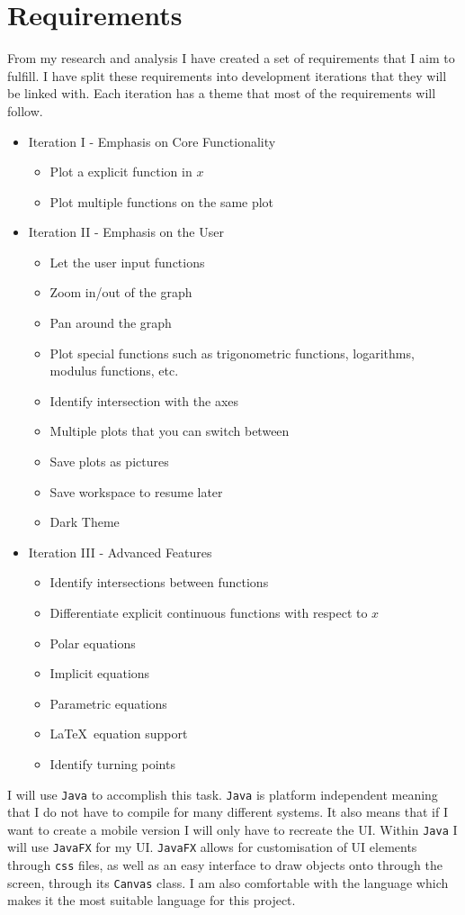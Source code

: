 \documentclass[../../../main.tex]{subfiles}
\begin{document}
\chapter{Requirements}
From my research and analysis I have created a set of requirements that I aim to fulfill. I have split these requirements into development iterations that they will be linked with. Each iteration has a theme that most of the requirements will follow.
\begin{itemize}
	\item Iteration I - Emphasis on Core Functionality
		\begin{itemize}
			\item Plot a explicit function in $x$
			\item Plot multiple functions on the same plot
		\end{itemize}
	\item Iteration II - Emphasis on the User
		\begin{itemize}
			\item Let the user input functions
			\item Zoom in/out of the graph
			\item Pan around the graph
			\item Plot special functions such as trigonometric functions, logarithms, modulus functions, etc.
			\item Identify intersection with the axes
			\item Multiple plots that you can switch between
			\item Save plots as pictures
			\item Save workspace to resume later
			\item Dark Theme
		\end{itemize}
	\item Iteration III - Advanced Features
		\begin{itemize}
			\item Identify intersections between functions
			\item Differentiate explicit continuous functions with respect to $x$
			\item Polar equations
			\item Implicit equations
			\item Parametric equations
			\item \LaTeX \ equation support
			\item Identify turning points 
		\end{itemize}
\end{itemize}
I will use \texttt{Java} to accomplish this task. \texttt{Java} is platform independent meaning that I do not have to compile for many different systems. It also means that if I want to create a mobile version I will only have to recreate the UI. Within \texttt{Java} I will use \texttt{JavaFX} for my UI. \texttt{JavaFX} allows for customisation of UI elements through \texttt{css} files, as well as an easy interface to draw objects onto through the screen, through its \texttt{Canvas} class.  I am also comfortable with the language which makes it the most suitable language for this project.
\end{document}
